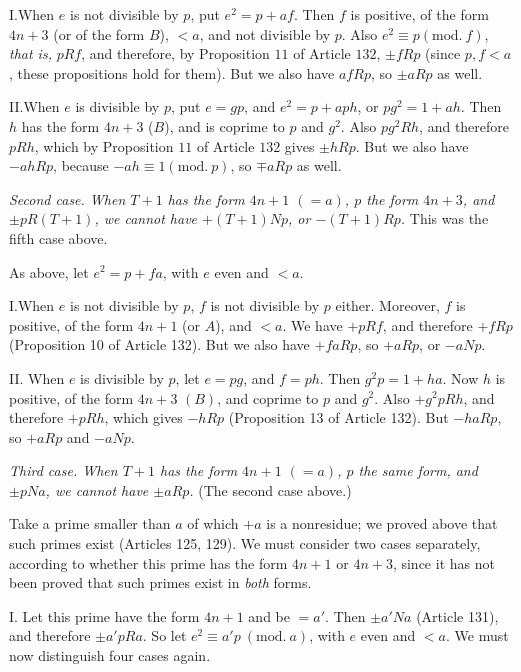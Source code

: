 I.\quad When $e$ is not divisible by $p$, put $e^2=p+af$. Then $f$ is positive, of the form $4n+3$ (or of the form $B$), $<a$, and not divisible by $p$. Also $e^2\equiv p(\mathrm{mod.}\ f)$, \emph{that is,} $pRf$, and therefore, by Proposition $11$ of Article $132$, $\pm fRp$ (since $p,f<a$, these propositions hold for them). But we also have $afRp$, so $\pm aRp$ as well.

II.\quad When $e$ is divisible by $p$, put $e=gp$, and $e^2=p+aph$, or $pg^2=1+ah$. Then $h$ has the form $4n+3$ ($B$), and is coprime to $p$ and $g^2$. Also $pg^2Rh$, and therefore $pRh$, which by Proposition $11$ of Article $132$ gives $\pm hRp$. But we also have $-ahRp$, because $-ah\equiv1(\mathrm{mod.}\ p)$, so $\mp aRp$ as well.

\emph{Second case. When $T+1$ has the form $4n+1$ $(=a)$, $p$ the form $4n+3$, and $\pm pR(T+1)$, we cannot have $+(T+1)Np$, or $-(T+1)Rp$.} This was the fifth case above.

As above, let $e^2=p+fa$, with $e$ even and $<a$.

I.\quad When $e$ is not divisible by $p$, $f$ is not divisible by $p$ either. Moreover, $f$ is positive, of the form $4n+1$ (or $A$), and $<a$. We have $+pRf$, and therefore $+fRp$ (Proposition 10 of Article 132). But we also have $+faRp$, so $+aRp$, or $-aNp$.

II. When $e$ is divisible by $p$, let $e=pg$, and $f=ph$. Then $g^2p=1+ha$. Now $h$ is positive, of the form $4n+3$ $(B)$, and coprime to $p$ and $g^2$. Also $+g^2pRh$, and therefore $+pRh$, which gives $-hRp$ (Proposition 13 of Article 132). But $-haRp$, so $+aRp$ and $-aNp$.

\textit{Third case. When $T+1$ has the form $4n+1$ $(=a)$, $p$ the same form, and $\pm pNa$, we cannot have $\pm aRp$.} (The second case above.)

Take a prime smaller than $a$ of which $+a$ is a nonresidue; we proved above that such primes exist (Articles 125, 129). We must consider two cases separately, according to whether this prime has the form $4n+1$ or $4n+3$, since it has not been proved that such primes exist in \textit{both} forms.

I. Let this prime have the form $4n+1$ and be $=a'$. Then $\pm a'Na$ (Article 131), and therefore $\pm a'pRa$. So let $e^2\equiv a'p\ (\mathrm{mod.}\ a)$, with $e$ even and $<a$. We must now distinguish four cases again.

